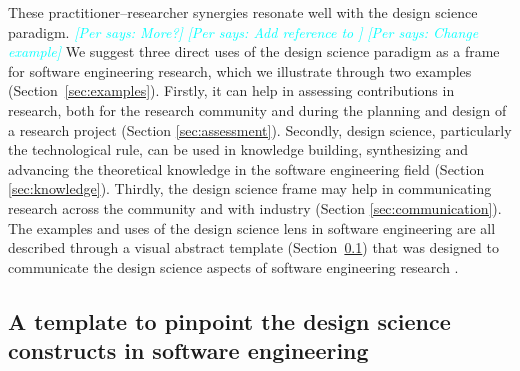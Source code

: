 \documentclass[graybox]{svmult}
\newcommand{\per}[1]{\textcolor{cyan}{{\it [Per says: #1]}}}
\newcommand{\per}[1]{}
\begin{document}
These practitioner--researcher synergies resonate well with the design science paradigm. \per{More?}
\per{Add reference to \cite{Engstrom19arxiv} }
\per {Change example}
We suggest three direct uses of the design science paradigm as a frame for software engineering research, which we illustrate through two examples (Section~\ref{sec:examples}). Firstly, it can help in assessing contributions in research, both for the research community and during the planning and design of a research project (Section \ref{sec:assessment}). Secondly, design science, particularly the technological rule, can be used in knowledge building, synthesizing and advancing the theoretical knowledge in the software engineering field (Section \ref{sec:knowledge}). Thirdly, the design science frame may help in communicating research across the community and with industry (Section \ref{sec:communication}). The examples and uses of the design science lens in software engineering are all described through a visual abstract template (Section~\ref{sec:VA_template}) that was designed to communicate the design science aspects of software engineering research . 

\subsection{A template to pinpoint the design science constructs in software engineering}
\label{sec:VA_template}

\end{document}
